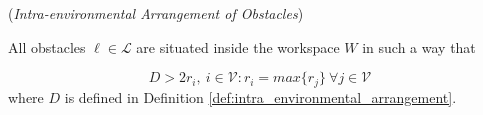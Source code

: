\begin{gg_box}
  \begin{assumption}(\textit{Intra-environmental Arrangement of Obstacles})

    All obstacles $\ell \in \mathcal{L}$ are situated inside the workspace $W$
    in such a way that

  \begin{equation}
    D > 2 r_i,\ i \in \mathcal{V} : r_i = max\{r_j\}\ \forall j \in \mathcal{V}
  \label{eq:geometric_constraint}
  \end{equation}
  where $D$ is defined in Definition \eqref{def:intra_environmental_arrangement}.
\label{ass:intra_environmental_arrangement}
\end{assumption}
\end{gg_box}
